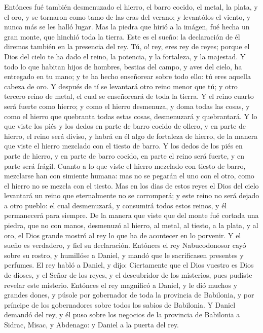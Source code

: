 \bverse Entónces fué también desmenuzado el hierro, el barro cocido, el metal, la plata, y el oro, y se tornaron como tamo de las eras del verano; y levantólos el viento, y nunca más se les halló lugar. Mas la piedra que hirió a la imágen, fué hecha un gran monte, que hinchió toda la tierra.
\bverse Este es el sueño: la declaración de él diremos también en la presencia del rey.
\bverse Tú, o! rey, eres rey de reyes; porque el Dios del cielo te ha dado el reino, la potencia, y la fortaleza, y la majestad.
\bverse Y todo lo que habitan hijos de hombres, bestias del campo, y aves del cielo, ha entregado en tu mano; y te ha hecho enseñorear sobre todo ello: tú eres aquella cabeza de oro.
\bverse Y después de tí se levantará otro reino menor que tú; y otro tercero reino de metal, el cual se enseñoreará de toda la tierra.
\bverse Y el reino cuarto será fuerte como hierro; y como el hierro desmenuza, y doma todas las cosas, y como el hierro que quebranta todas estas cosas, desmenuzará y quebrantará.
\bverse Y lo que viste los piés y los dedos en parte de barro cocido de ollero, y en parte de hierro, el reino será diviso, y habrá en él algo de fortaleza de hierro, de la manera que viste el hierro mezclado con el tiesto de barro.
\bverse Y los dedos de los piés en parte de hierro, y en parte de barro cocido, en parte el reino será fuerte, y en parte será frágil.
\bverse Cuanto a lo que viste el hierro mezclado con tiesto de barro, mezclarse han con simiente humana: mas no se pegarán el uno con el otro, como el hierro no se mezcla con el tiesto.
\bverse Mas en los dias de estos reyes el Dios del cielo levantará un reino que eternalmente no se corromperá; y este reino no será dejado a otro pueblo: el cual desmenuzará, y consumirá todos estos reinos, y él permanecerá para siempre.
\bverse De la manera que viste que del monte fué cortada una piedra, que no con manos, desmenuzó al hierro, al metal, al tiesto, a la plata, y al oro, el Dios grande mostró al rey lo que ha de acontecer en lo porvenir. Y el sueño es verdadero, y fiel su declaración.
\bverse Entónces el rey Nabucodonosor cayó sobre su rostro, y humillóse a Daniel, y mandó que le sacrificasen presentes y perfumes.
\bverse El rey habló a Daniel, y dijo: Ciertamente que el Dios vuestro es Dios de dioses, y el Señor de los reyes, y el descubridor de los misterios, pues pudiste revelar este misterio.
\bverse Entónces el rey magnificó a Daniel, y le dió muchos y grandes dones, y púsole por gobernador de toda la provincia de Babilonia, y por príncipe de los gobernadores sobre todos los sabios de Babilonia.
\bverse Y Daniel demandó del rey, y él puso sobre los negocios de la provincia de Babilonia a Sidrac, Misac, y Abdenago: y Daniel a la puerta del rey.



